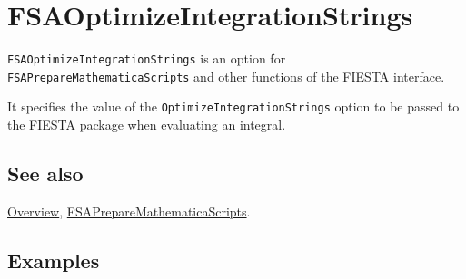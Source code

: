 \documentclass[../FeynHelpersManual.tex]{subfiles}
\begin{document}
\begin{Shaded}
\begin{Highlighting}[]
 
\end{Highlighting}
\end{Shaded}

\hypertarget{fsaoptimizeintegrationstrings}{
\section{FSAOptimizeIntegrationStrings}\label{fsaoptimizeintegrationstrings}}

\texttt{FSAOptimizeIntegrationStrings} is an option for
\texttt{FSAPrepareMathematicaScripts} and other functions of the FIESTA
interface.

It specifies the value of the \texttt{OptimizeIntegrationStrings} option
to be passed to the FIESTA package when evaluating an integral.

\subsection{See also}

\hyperlink{toc}{Overview},
\hyperlink{fsapreparemathematicascripts}{FSAPrepareMathematicaScripts}.

\subsection{Examples}
\end{document}
